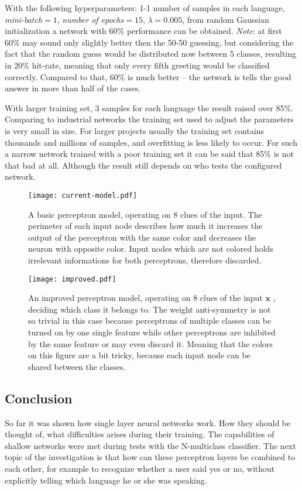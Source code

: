 With the following hyperparameters: 1-1 number of samples in each language, \emph{mini-batch}$=1$, \emph{number of epochs}$=15$, $\lambda=0.005$, from random Gaussian initialization a network with 60\% performance can be obtained.
\emph{Note}: at first 60\% may sound only slightly better then the 50-50 guessing, but considering the fact that the random guess would be distributed now between 5 classes, resulting in 20\% hit-rate, meaning that only every fifth greeting would be classified correctly. 
Compared to that, 60\% is much better -- the network is tells the good answer in more than half of the cases.

With larger training set, 3 samples for each language the result raised over 85\%. Comparing to industrial networks the training set used to adjust the parameters is very small in size. 
For larger projects usually the training set contains thousands and millions of samples, and overfitting is less likely to occur. 
For such a narrow network trained with a poor training set it can be said that 85\% is not that bad at all. Although the result still depends on who tests the configured network.

\begin{figure}
	\centering
	\texttt{[image: current-model.pdf]}
	\caption{A basic perceptron model, operating on 8 clues of the input. The perimeter of each input node describes how much it increases the output of the perceptron with the same color and decreases the neuron with opposite color. Input nodes which are not colored holds irrelevant informations for both perceptrons, therefore discarded.}
	
	\label{fig:dumb}
\end{figure}

\begin{figure}
	\centering
	\texttt{[image: improved.pdf]}
	\caption{An improved perceptron model, operating on 8 clues of the input $\mathbf{x}$ , deciding which class it belongs to. The weight anti-symmetry is not so trivial in this case because perceptrons of multiple classes can be turned on by one single feature while other perceptrons are inhibited by the same feature or may even discard it. Meaning that the colors on this figure are a bit tricky, because each input node can be shared between the classes.}
	
	\label{fig:improved}
\end{figure}

\subsection{Conclusion}
So far it was shown how single layer neural networks work. 
How they should be thought of, what difficulties arises during their training. 
The capabilities of shallow networks were met during tests with the N-multiclass classifier. 
The next topic of the investigation is that how can these perceptron layers be combined to each other, 
for example to recognize whether a user said yes or no, without explicitly telling  which language he or she was speaking.

